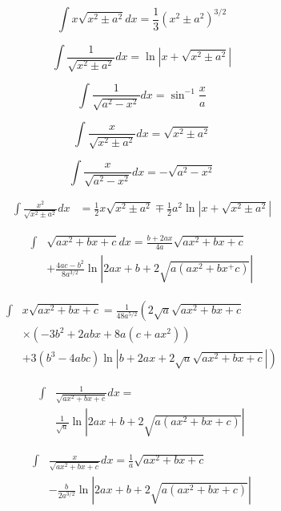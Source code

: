 \documentclass[11pt, letterpaper, notitlepage]{article}
\begin{document}
\begin{multicols}{2}
\begin{footnotesize}
\begin{equation}
\int  x \sqrt{x^2 \pm a^2} dx= \frac{1}{3}\left ( x^2 \pm a^2 \right)^{3/2} 
\end{equation}

\begin{equation}
\int \frac{1}{\sqrt{x^2 \pm a^2}} dx = \ln \left | x + \sqrt{x^2 \pm a^2} \right | 
\end{equation}

\begin{equation}
\int \frac{1}{\sqrt{a^2 - x^2}} dx = \sin^{-1}\frac{x}{a} 
\end{equation}

\begin{equation}
\int \frac{x}{\sqrt{x^2\pm a^2}}dx = \sqrt{x^2 \pm a^2} 
\end{equation}

\begin{equation}
\int \frac{x}{\sqrt{a^2-x^2}}dx = -\sqrt{a^2-x^2} 
\end{equation}

\begin{align}
\int \frac{x^2}{\sqrt{x^2 \pm a^2}} dx &= \frac{1}{2}x\sqrt{x^2 \pm a^2}
\mp \frac{1}{2}a^2 \ln \left| x + \sqrt{x^2\pm a^2} \right | 
\end{align}

\begin{align}
\int &\sqrt{a x^2 + b x + c} dx = 
\frac{b+2ax}{4a}\sqrt{ax^2+bx+c}
\nonumber \\ &
+
\frac{4ac-b^2}{8a^{3/2}}\ln \left| 2ax + b + 2\sqrt{a(ax^2+bx^+c)}\right |
\end{align}

\begin{align}
\int &x \sqrt{a x^2 + bx + c} = \frac{1}{48a^{5/2}}\left ( 
2 \sqrt{a} \sqrt{ax^2+bx+c}
\right . \nonumber \\ & 
 \times \left( -3b^2 + 2 abx + 8 a(c+ax^2) \right)
 \nonumber \\ & \left.
 + 3(b^3-4abc)\ln \left|b + 2ax + 2\sqrt{a}\sqrt{ax^2+bx+c} \right| \right)
\end{align}

\begin{align}
\int&\frac{1}{\sqrt{ax^2+bx+c}}dx
=\nonumber \\&
\frac{1}{\sqrt{a}}\ln \left| 2ax+b + 2 \sqrt{a(ax^2+bx+c)} \right | 
\end{align}

\begin{align}
\int &\frac{x}{\sqrt{ax^2+bx+c}}dx=
\frac{1}{a}\sqrt{ax^2+bx + c} \nonumber \\&
-
\frac{b}{2a^{3/2}}\ln \left| 2ax+b + 2 \sqrt{a(ax^2+bx+c)} \right |
\end{align}


\end{footnotesize}
\end{multicols}
\end{document}
